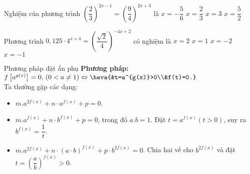 \begin{ex}%
	Nghiệm của phương trình $\left(\dfrac{2}{3}\right)^{2x-1}=\left(\dfrac{9}{4}\right)^{2x+3}$ là 
	\choice
	{\True $x=-\dfrac{5}{6}$}
	{$x=\dfrac{2}{3}$}
	{$x=3$}
	{$x=\dfrac{5}{2}$}
\end{ex}

\begin{ex}%
	Phương trình $0,125\cdot 4^{x+4}=\left(\dfrac{\sqrt{2}}{4}\right)^{-4x+2}$ có nghiệm là 
	\choice
	{\True $x=2$}
	{$x=1$}
	{$x=-2$}
	{$x=-1$}
\end{ex}

\begin{dang}{Phương pháp đặt ẩn phụ}
	\textbf{Phương pháp:} $f\left[a^{g(x)}\right]=0,\,(0<a\neq 1) \Leftrightarrow \heva{&t=a^{g(x)}>0\\&f(t)=0.}$ \\
	Ta thường gặp các dạng:
	\begin{itemize}
		\item $m.a^{2f(x)}+n\cdot a^{f(x)}+p=0$.
		\item $m.a^{f(x)}+n\cdot b^{f(x)}+p=0$, trong đó $a.b=1$. Đặt $t=a^{f(x)}(t>0)$, suy ra $b^{f(x)}=\dfrac{1}{t}$.
		\item $m.a^{2f(x)}+n\cdot (a\cdot b)^{f(x)}+p\cdot b^{2f(x)}=0$. Chia hai vế cho $b^{2f(x)}$ và đặt $t=\left(\dfrac{a}{b}\right)^{f(x)}>0$.
	\end{itemize}
\end{dang}

